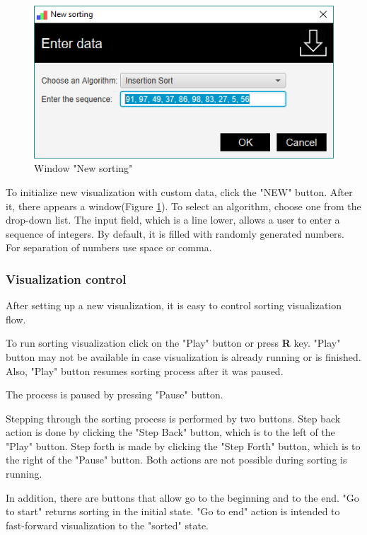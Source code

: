 \documentclass[
  field=inf,
  biblatex,
  language=english,
  glossaries,
  theorems=false,
  index
]{kidiplom}
\begin{document}
\begin{figure}[H]
\begin{center}
	\includegraphics[scale=0.5]{img/ui/WindowNew.png}
	\caption{Window "New sorting"}\label{fig:new}
\end{center}
\end{figure}

To initialize new visualization with custom data, click the "NEW" button. After it, there appears a window(Figure \ref{fig:new}). To select an algorithm, choose one from the drop-down list. The input field, which is a line lower, allows a user to enter a sequence of integers. By default, it is filled with randomly generated numbers. For separation of numbers use space or comma.

\subsubsection{Visualization control}

After setting up a new visualization, it is easy to control sorting visualization flow.

To run sorting visualization click on the "Play" button or press \textbf{R} key. "Play" button may not be available in case visualization is already running or is finished. Also, "Play" button resumes sorting process after it was paused.

The process is paused by pressing "Pause" button.

Stepping through the sorting process is performed by two buttons. Step back action is done by clicking the "Step Back" button, which is to the left of the "Play" button. Step forth is made by clicking the "Step Forth" button, which is to the right of the "Pause" button. Both actions are not possible during sorting is running.

In addition, there are buttons that allow go to the beginning and to the end. "Go to start" returns sorting in the initial state. "Go to end" action is intended to fast-forward visualization to the "sorted" state.
\end{document}
